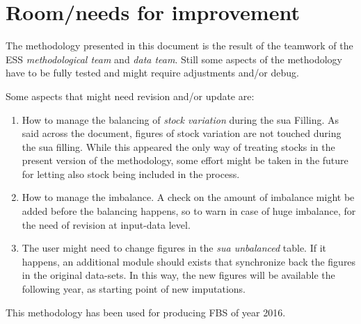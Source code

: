 \documentclass[]{article}
\providecommand{\tightlist}{%
  \setlength{\itemsep}{0pt}\setlength{\parskip}{0pt}}
\begin{document}
\section*{Room/needs for improvement}\label{roomneeds-for-improvement}

The methodology presented in this document is the result of the teamwork
of the ESS \emph{methodological team} and \emph{data team}. Still some
aspects of the methodology have to be fully tested and might require
adjustments and/or debug.

Some aspects that might need revision and/or update are:

\begin{enumerate}
\def\labelenumi{\arabic{enumi}.}
\tightlist
\item
  How to manage the balancing of \emph{stock variation} during the sua
  Filling. As said across the document, figures of stock variation are
  not touched during the sua filling. While this appeared the only way
  of treating stocks in the present version of the methodology, some
  effort might be taken in the future for letting also stock being
  included in the process.
\item
  How to manage the imbalance. A check on the amount of imbalance might
  be added before the balancing happens, so to warn in case of huge
  imbalance, for the need of revision at input-data level.
\item
  The user might need to change figures in the \emph{sua unbalanced}
  table. If it happens, an additional module should exists that
  synchronize back the figures in the original data-sets. In this way,
  the new figures will be available the following year, as starting
  point of new imputations.
\end{enumerate}

This methodology has been used for producing FBS of year 2016.
\end{document}
